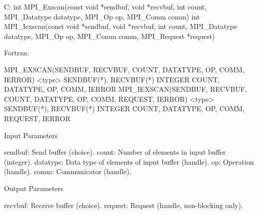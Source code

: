 C:
int MPI_Exscan(const void *sendbuf, void *recvbuf, int count,
    MPI_Datatype datatype, MPI_Op op, MPI_Comm comm)
int MPI_Iexscan(const void *sendbuf, void *recvbuf, int count,
    MPI_Datatype datatype, MPI_Op op, MPI_Comm comm,
    MPI_Request *request)

Fortran:

MPI_EXSCAN(SENDBUF, RECVBUF, COUNT, DATATYPE, OP, COMM, IERROR)
    <type>    SENDBUF(*), RECVBUF(*)
    INTEGER    COUNT, DATATYPE, OP, COMM, IERROR
MPI_IEXSCAN(SENDBUF, RECVBUF, COUNT, DATATYPE, OP, COMM, REQUEST, IERROR)
    <type>    SENDBUF(*), RECVBUF(*)
    INTEGER    COUNT, DATATYPE, OP, COMM, REQUEST, IERROR

Input Parameters

sendbuf: Send buffer (choice).
count: Number of elements in input buffer (integer).
datatype: Data type of elements of input buffer (handle).
op: Operation (handle).
comm: Communicator (handle).

Output Parameters

recvbuf: Receive buffer (choice).
request: Request (handle, non-blocking only).
